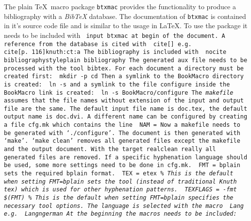The plain \TeX\ macro package {\tt btxmac} provides the functionality
to produce a bibliography with a {\sl BibTeX} database.
The documentation of {\tt btxmac} is contained in it's source
code file and is similar to the usage in \LaTeX.
To use the package it needs to be included with
\BeginDisp\tt
\RS input btxmac
\End
at begin of the document.
A reference from the database is cited with
\BeginDisp\tt
\RS cite[]\lC{}\rC
\End
e.\thinspace g.
\BeginDisp\tt
\RS cite[p.\ 116]\lC knuth:ct:a\rC
\End
The bibliography is included with
\BeginDisp\tt
\RS nocite\lC *\rC
\RS bibliographystyle\lC plain\rC
\RS bibliography\lC{}\rC
\End
The generated {\tt aux} file needs to be processed
with the tool {\tt bibtex}.
%
For each document a directory must be created first:
\BeginDisp\tt
mkdir -p 
cd 
\End
Then a symlink to the BookMacro directory is created:
\BeginDisp\tt
ln -s 
\End
and a symlink to the file {\tt configure} inside the {\tt BookMacro}
link is created:
\BeginDisp\tt
ln -s BookMacro/configure
\End
The {\sl makefile} assumes that the file names without extension of the input
and output file are the same.
The default input file name is {\tt doc.tex}, the default output name
is {\tt doc.dvi}.
A different name can be configured by creating a file
{\tt cfg.mk}
which contains the line
\BeginDisp\tt
NAM = 
\End
Now a makefile needs to be generated with `{\tt./configure}'.
The document is then generated with `{\tt make}'.
`{\tt make clean}' removes all generated files except the makefile and
the output document.
With the target {\tt realclean}
really all generated files are removed.
\medskip\noindent
If a specific hyphenation language should be used,
some more settings need to be done in {\tt cfg.mk}.
\BeginDisp\tt
FMT = bplain
\End
sets the required {\tt bplain} format.
\BeginDisp\tt
TEX = etex \it\% This is the default when setting FMT=bplain
\End
sets the tool (instead of traditional Knuth {\tt tex})
which is used for other hyphenation patterns.
\BeginDisp\tt
TEXFLAGS = -fmt \$(FMT) \it\% This is the default when setting FMT=bplain
\End
specifies the necessary tool options.
\medskip\noindent
The language is selected with the macro
\BeginDisp\tt
\RS Lang\lC{}\rC
\End
e.\thinspace g.
\BeginDisp\tt
\RS Lang\lC ngerman\rC
\End
{}%
At the beginning the macros needs to be included:
